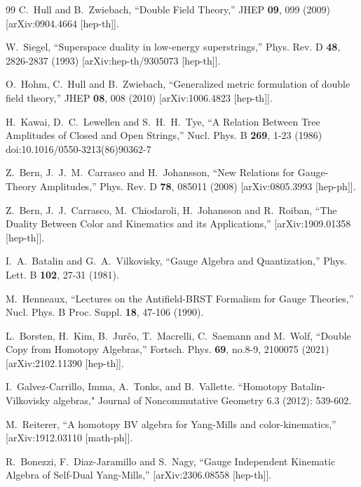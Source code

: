 \documentclass[12pt]{article}\pdfoutput=1
\begin{document}
\begin{thebibliography}{99}
C.~Hull and B.~Zwiebach,
``Double Field Theory,''
JHEP \textbf{09}, 099 (2009)
[arXiv:0904.4664 [hep-th]].

W.~Siegel,
``Superspace duality in low-energy superstrings,''
Phys. Rev. D \textbf{48}, 2826-2837 (1993)
[arXiv:hep-th/9305073 [hep-th]].

O.~Hohm, C.~Hull and B.~Zwiebach,
``Generalized metric formulation of double field theory,''
JHEP \textbf{08}, 008 (2010)
[arXiv:1006.4823 [hep-th]].

H.~Kawai, D.~C.~Lewellen and S.~H.~H.~Tye,
``A Relation Between Tree Amplitudes of Closed and Open Strings,''
Nucl. Phys. B \textbf{269}, 1-23 (1986)
doi:10.1016/0550-3213(86)90362-7

Z.~Bern, J.~J.~M.~Carrasco and H.~Johansson,
``New Relations for Gauge-Theory Amplitudes,''
Phys. Rev. D \textbf{78}, 085011 (2008)
[arXiv:0805.3993 [hep-ph]].

Z.~Bern, J.~J.~Carrasco, M.~Chiodaroli, H.~Johansson and R.~Roiban,
``The Duality Between Color and Kinematics and its Applications,''
[arXiv:1909.01358 [hep-th]].

I.~A.~Batalin and G.~A.~Vilkovisky,
``Gauge Algebra and Quantization,''
Phys. Lett. B \textbf{102}, 27-31 (1981). 

M.~Henneaux,
``Lectures on the Antifield-BRST Formalism for Gauge Theories,''
Nucl. Phys. B Proc. Suppl. \textbf{18}, 47-106 (1990). 


L.~Borsten, H.~Kim, B.~Jur\v{c}o, T.~Macrelli, C.~Saemann and M.~Wolf,
``Double Copy from Homotopy Algebras,''
Fortsch. Phys. \textbf{69}, no.8-9, 2100075 (2021)
[arXiv:2102.11390 [hep-th]].

I.~Galvez-Carrillo, Imma, A.~Tonks, and B.~Vallette. 
``Homotopy Batalin-Vilkovisky algebras," Journal of Noncommutative Geometry 6.3 (2012): 539-602.


M.~Reiterer,
``A homotopy BV algebra for Yang-Mills and color-kinematics,''
[arXiv:1912.03110 [math-ph]].

R.~Bonezzi, F.~Diaz-Jaramillo and S.~Nagy,
``Gauge Independent Kinematic Algebra of Self-Dual Yang-Mills,''
[arXiv:2306.08558 [hep-th]].


\end{thebibliography}
\end{document}
